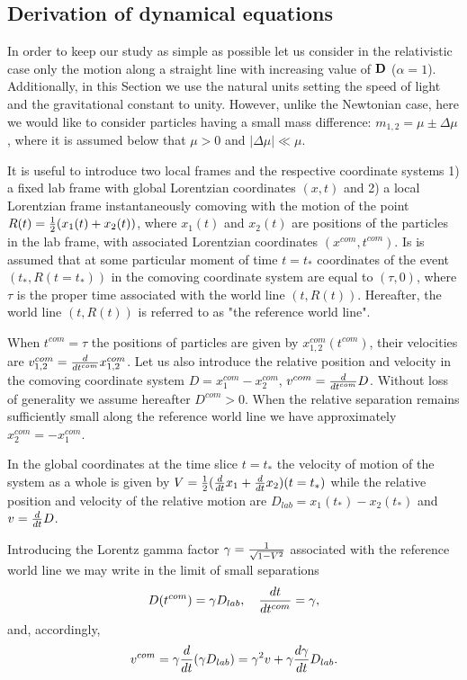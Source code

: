 \documentclass[aip,nofootinbib]{revtex4}
\begin{document}
\subsection{Derivation of dynamical equations}

In order to keep our study as simple as possible let us consider
in the relativistic case only the motion along a straight line
with increasing value of ${\bf D}$ ($\alpha = 1$). Additionally,
in this Section we use the natural units setting the speed of
light and the gravitational constant to unity. However, unlike the
Newtonian case, here we would like to consider particles having a
small mass difference: $m_{1,2}=\mu \pm \Delta \mu$, where it is
assumed below that $\mu
> 0$ and $|\Delta \mu | \ll \mu$.


It is useful to introduce two local frames and the respective
coordinate systems 1) a fixed lab frame with global Lorentzian
coordinates $(x,t)$ and 2) a local Lorentzian  frame
instantaneously comoving with the motion of the point
$R(t)={1\over 2}(x_{1}(t)+x_{2}(t))$, where $x_1(t)$ and
$x_{2}(t)$ are positions of the particles in the lab frame, with
associated Lorentzian coordinates $(x^{com},t^{com})$.  Is is
assumed that at some particular moment of time $t=t_*$ coordinates
of the event $(t_*, R(t=t_*))$ in the comoving coordinate system
are equal to $(\tau, 0)$, where $\tau$ is the proper time
associated with the world line $(t, R(t))$. Hereafter, the world
line $(t, R(t))$ is referred to as "the reference world line".


When $t^{com}=\tau$ the positions of particles are given by
$x^{com}_{1,2}(t^{com})$, their velocities are
$v^{com}_{1,2}={d\over dt^{com}}x^{com}_{1,2}$. Let us also
introduce the relative position and velocity in the comoving
coordinate system $D=x_1^{com}-x_2^{com}$, $v^{com}={d\over
dt^{com}}D$. Without loss of generality we assume hereafter
$D^{com} > 0$. When the relative separation remains sufficiently
small along the reference world line we  have approximately
$x^{com}_{2}=-x^{com}_{1}$.

In the global coordinates at the time slice $t=t_*$ the velocity
of motion of the system as a whole is given by $V={1\over
2}({d\over dt}x_1+{d\over dt}x_2)(t=t_*)$ while the relative
position and velocity of the relative motion are
$D_{lab}=x_1(t_*)-x_2(t_*)$ and $v={d\over dt}D$.


Introducing the Lorentz gamma factor $\gamma ={1\over
\sqrt{1-V^{2}}}$ associated with the reference world line we may
write in the limit of small separations
\begin{equation}
D(t^{com})=\gamma D_{lab}, \quad {dt\over dt^{com}}=\gamma ,
\label{e9}
\end{equation}
and, accordingly,
\begin{equation}
v^{com}=\gamma{d\over dt}(\gamma D_{lab})=\gamma^{2}v+\gamma
{d\gamma \over dt}D_{lab}. \label{e10}
\end{equation}
\end{document}
